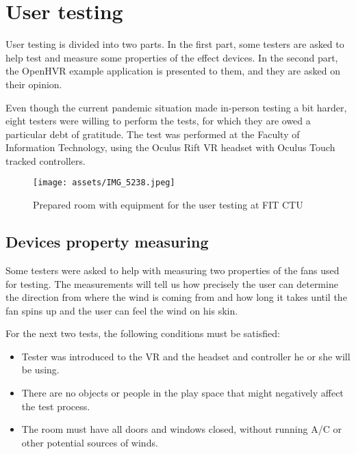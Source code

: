 \chapter{User testing}

User testing is divided into two parts. In the first part,
some testers are asked to help test and measure some properties
of the effect devices. In the second part, the OpenHVR example application is
presented to them, and they are asked on their opinion.


Even though the current pandemic situation made in-person testing a bit harder,
eight testers were willing to perform the tests, for which they are owed
a particular debt of gratitude.
The test was performed at the Faculty of Information Technology, using
the Oculus Rift VR headset with Oculus Touch tracked controllers.


\begin{figure}[h]{}
\centering\texttt{[image: assets/IMG\_5238.jpeg]}
\caption{Prepared room with equipment for the user testing at FIT CTU}
\end{figure}

\hypertarget{x-devices-property-measuring}{\section{Devices property measuring}}
Some testers were asked to help with measuring two properties of the fans used
for testing. The measurements will tell us how precisely the user can determine the
direction from where the wind is coming from and how long it takes until the
fan spins up and the user can feel the wind on his skin.


For the next two tests, the following conditions must be satisfied:


\begin{itemize}

\item Tester was introduced to the VR and the headset and controller
he or she will be using.

\item There are no objects or people in the play space that might negatively affect
the test process.

\item The room must have all doors and windows closed, without running A/C
or other potential sources of winds.

\end{itemize}


